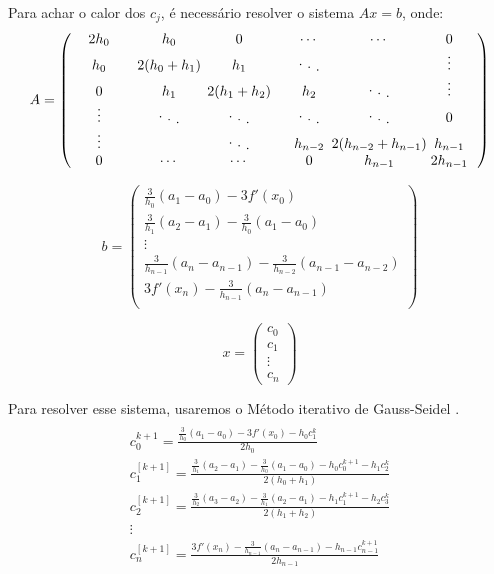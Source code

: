 \documentclass[a4paper,10pt]{article}
\newcommand{\diagentry}[1]{\mathmakebox[4em]{#1}}
\newcommand{\xddots}{%
 \raise 3pt \hbox {.}
  \mkern 6mu
  \raise 1pt \hbox {.}
  \mkern 6mu
  \raise -1pt \hbox {.}
}
\begin{document}
  Para achar o calor dos $c_j$, é necessário resolver o sistema $Ax=b$, onde: 
  \begin{equation}
   A = 
   \begin{pmatrix}
    \diagentry{2h_0} & \diagentry{h_0}&0&\cdots&\cdots&0\\
    \diagentry{h_0} & \diagentry{2(h_0+h_1)} & \diagentry{h_1}&\diagentry{\xddots}&&\vdots\\
    0 &\diagentry {h_1} & \diagentry{2(h_1+h_2)} & \diagentry{h_2}&\diagentry{\xddots}&\vdots\\
    \vdots & \diagentry{\xddots} & \diagentry{\xddots} & \diagentry{\xddots} & \diagentry{\xddots}&0\\
    \vdots && \diagentry{\xddots} & \diagentry {h_{n-2}} & \diagentry{2(h_{n-2}+h_{n-1})} & \diagentry{h_{n-1}}\\
    0 &\cdots&\cdots&0& h_{n-1} & 2h_{n-1}\\
   \end{pmatrix}
   \label{eq:sistema}
  \end{equation}
  
  \begin{equation}
   b = 
   \begin{pmatrix}
    \frac{3}{h_0}(a_1-a_0)-3f'(x_0)\\
    \frac{3}{h_1}(a_2-a_1)-\frac{3}{h_0}(a_1-a_0)\\
    \vdots\\
    \frac{3}{h_{n-1}}(a_n-a_{n-1})-\frac{3}{h_{n-2}}(a_{n-1}-a_{n-2})\\
    3f'(x_n)-\frac{3}{h_{n-1}}(a_n-a_{n-1})\\

   \end{pmatrix}
  \end{equation}
  
  \begin{equation}
    x = 
      \begin{pmatrix}
	c_0\\
	c_1\\
	\vdots\\
	c_n
      \end{pmatrix}
   \end{equation}

Para resolver esse sistema, usaremos o Método iterativo de Gauss-Seidel \cite{humes}. 
  \begin{multline}
\\c_0^{k+1} = \frac{\frac{3}{h_0}(a_1-a_0)-3f'(x_0) - h_0c_1^{k}}{2h_0}\\
c_1^{[k+1]} = \frac{\frac{3}{h_1}(a_2-a_1)-\frac{3}{h_0}(a_1-a_0)-h_0c_0^{k+1}-h_1c_2^k}{2(h_0+h_1)}\\
c_2^{[k+1]} = \frac{\frac{3}{h_2}(a_3-a_2)-\frac{3}{h_1}(a_2-a_1)-h_1c_1^{k+1}-h_2c_3^k}{2(h_1+h_2)}\\
\vdots \\
c_{n}^{[k+1]} = \frac{3f'(x_n)-\frac{3}{h_{n-1}}(a_n-a_{n-1})-h_{n-1}c_{n-1}^{k+1}}{2h_{n-1}}\\
  \end{multline}
  
\end{document}
